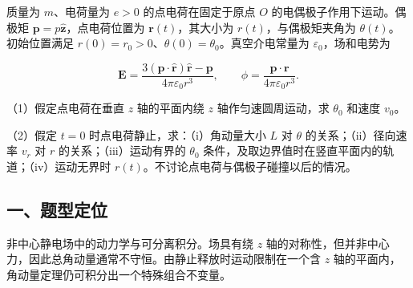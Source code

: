 \documentclass[12pt,a4paper,fontset=fandol]{ctexart}
\begin{document}
质量为 \(m\)、电荷量为 \(e>0\) 的点电荷在固定于原点 \(O\)
的电偶极子作用下运动。偶极矩
\(\boldsymbol p=p\hat{\boldsymbol z}\)，点电荷位置为
\(\boldsymbol r(t)\)，其大小为 \(r(t)\)，与偶极矩夹角为
\(\theta(t)\)。初始位置满足
\(r(0)=r_0>0\)、\(\theta(0)=\theta_0\)。真空介电常量为
\(\varepsilon_0\)，场和电势为

\[\boldsymbol E=\frac{3(\boldsymbol p\cdot\hat{\boldsymbol r})\hat{\boldsymbol r}-\boldsymbol p}
{4\pi\varepsilon_0r^3},\qquad
\phi=\frac{\boldsymbol p\cdot\boldsymbol r}{4\pi\varepsilon_0r^3}.\]

\begin{center}
\begin{minipage}{\linewidth}
\centering\begingroup{}
\ifdim\wd\diagrambox>.88\linewidth
\sbox{\diagrambox}{\resizebox{.88\linewidth}{!}{\usebox{\diagrambox}}}\fi
\ifdim\ht\diagrambox>.38\textheight
\resizebox{!}{.38\textheight}{\usebox{\diagrambox}}
\else\usebox{\diagrambox}\fi
\par{}\endgroup\end{minipage}\end{center}

（1）假定点电荷在垂直 \(z\) 轴的平面内绕 \(z\) 轴作匀速圆周运动，求
\(\theta_0\) 和速度 \(v_0\)。

（2）假定 \(t=0\) 时点电荷静止，求：（i）角动量大小 \(L\) 对 \(\theta\)
的关系；（ii）径向速率 \(v_r\) 对 \(r\) 的关系；（iii）运动有界的
\(\theta_0\) 条件，及取边界值时在竖直平面内的轨道；（iv）运动无界时
\(r(t)\)。不讨论点电荷与偶极子碰撞以后的情况。

\subsection{一、题型定位}\label{ux4e00ux9898ux578bux5b9aux4f4d-4}

非中心静电场中的动力学与可分离积分。场具有绕 \(z\)
轴的对称性，但并非中心力，因此总角动量通常不守恒。由静止释放时运动限制在一个含
\(z\) 轴的平面内，角动量定理仍可积分出一个特殊组合不变量。
\end{document}
